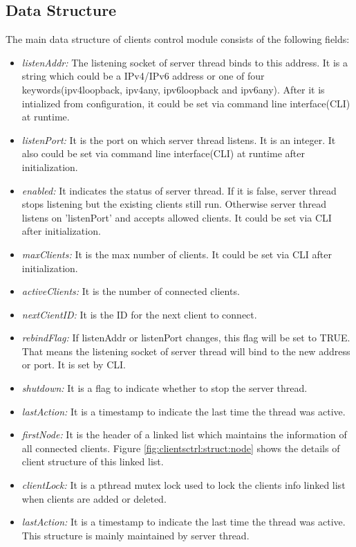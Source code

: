 \subsection{Data Structure}
The main data structure of clients control module consists of the following fields:
\begin{itemize}
\item{\emph{listenAddr:} The listening socket of server thread binds to this address.  It is a string which could be a IPv4/IPv6 address or one of four keywords(ipv4loopback, ipv4any, ipv6loopback and ipv6any). After it is intialized from configuration, it could be set via command line interface(CLI) at runtime.}
\item{\emph{listenPort:} It is the port on which server thread listens.  It is an integer.  It also could be set via command line interface(CLI) at runtime after initialization.}
\item{\emph{enabled:} It indicates the status of server thread.  If it is false, server thread stops listening but the existing clients still run. Otherwise server thread listens on 'listenPort' and accepts allowed clients. It could be set via CLI  after initialization.}
\item{\emph{maxClients:} It is the max number of clients. It could be set via CLI after initialization. }
\item{\emph{activeClients:} It is the number of connected clients. }
\item{\emph{nextCientID:} It is the ID for the next client to connect. }
\item{\emph{rebindFlag:} If listenAddr or listenPort changes, this flag will be set to TRUE. That means the listening socket of server thread will bind to the new address or port. It is set by CLI.  }
\item{\emph{shutdown:} It is a flag to indicate whether to stop the server thread. }
\item{\emph{lastAction:} It is a timestamp to indicate the last time the thread was active. }
\item{\emph{firstNode:} It is the header of a linked list which maintains the information of all connected clients. Figure \ref{fig:clientsctrl:struct:node} shows the details of client structure of this linked list.}
\item{\emph{clientLock:} It is a pthread mutex lock used to lock the clients info linked list when clients are added or deleted. }
\item{\emph{lastAction:} It is a timestamp to indicate the last time the thread was active. }
This structure is mainly maintained by server thread. 


\end{itemize}
